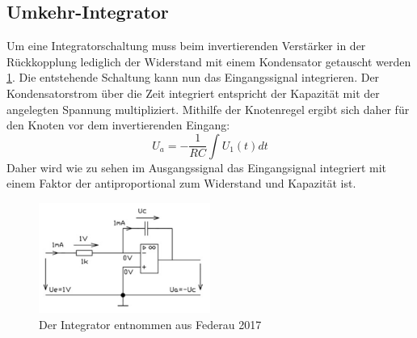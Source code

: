     \subsection{Umkehr-Integrator}
    \label{sec:integrator}
        Um eine Integratorschaltung muss beim invertierenden Verstärker in der Rückkopplung lediglich der Widerstand mit einem Kondensator getauscht werden \ref{fig:integrator}.
        Die entstehende Schaltung kann nun das Eingangssignal integrieren.
        Der Kondensatorstrom über die Zeit integriert entspricht der Kapazität mit der angelegten Spannung multipliziert.
        Mithilfe der Knotenregel ergibt sich daher für den Knoten vor dem invertierenden Eingang:
        \begin{equation*}
            U_a = -\frac{1}{RC} \int U_1(t) dt
        \end{equation*}
        Daher wird wie zu sehen im Ausgangssignal das Eingangsignal integriert mit einem Faktor der antiproportional zum Widerstand und Kapazität ist.
        \begin{figure}[ht]
            \centering
            \includegraphics[width = 0.5\textwidth]{bilder/integrator.png}
            \caption{Der Integrator entnommen aus Federau 2017}
            \label{fig:integrator}
        \end{figure}
